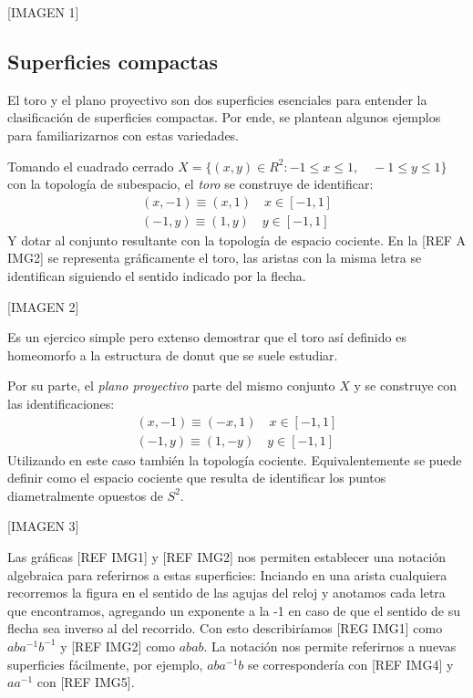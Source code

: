 \documentclass[a4paper,11pt,spanish, twoside, leqno]{tfg-uam}
\theoremstyle{definition}
\begin{document}
[IMAGEN 1]

\subsection{Superficies compactas}

El toro y el plano proyectivo son dos superficies esenciales para entender la clasificación de superficies compactas. Por ende, se plantean algunos ejemplos para familiarizarnos con estas variedades.

Tomando el cuadrado cerrado $ X = \{ (x,y) \in R^2: -1\leq x\leq 1,\quad -1\leq y \leq 1  \} $ con la topología de subespacio, el \textit{toro}  se construye de identificar:
\begin{align*}
(x,-1)\equiv(x,1) \quad x\in [-1,1]\\
(-1,y)\equiv(1,y) \quad y\in [-1,1] 
\end{align*}
Y dotar al conjunto resultante con la topología de espacio cociente. En la [REF A IMG2] se representa gráficamente el toro, las aristas con la misma letra se identifican siguiendo el sentido indicado por la flecha.

[IMAGEN 2]

Es un ejercico simple pero extenso  demostrar que  el toro así definido es homeomorfo a la estructura de donut que se suele estudiar.

Por su parte, el \textit{plano proyectivo} parte del mismo conjunto $X$ y se construye con las identificaciones:
\begin{align*}
(x,-1)\equiv(-x,1) \quad x\in [-1,1]\\
(-1,y)\equiv(1,-y) \quad y\in [-1,1] 
\end{align*}
Utilizando en este caso también la topología cociente. Equivalentemente se puede definir como el espacio cociente que resulta de identificar los puntos diametralmente opuestos de $S^2$.

[IMAGEN 3]

Las gráficas [REF IMG1] y [REF IMG2] nos permiten establecer una notación algebraica para referirnos a estas superficies: 
Inciando en una arista cualquiera recorremos la figura en el sentido de las agujas del reloj y anotamos cada letra que encontramos, agregando un exponente a la -1 en caso de que el sentido de su flecha sea inverso al del recorrido. Con esto describiríamos [REG IMG1] como $aba^{-1}b^{-1}$ y [REF IMG2] como $abab$. La notación nos permite referirnos a nuevas superficies fácilmente, por ejemplo, $aba^{-1}b$ se correspondería con [REF IMG4] y $aa^{-1}$ con [REF IMG5]. 
\end{document}
